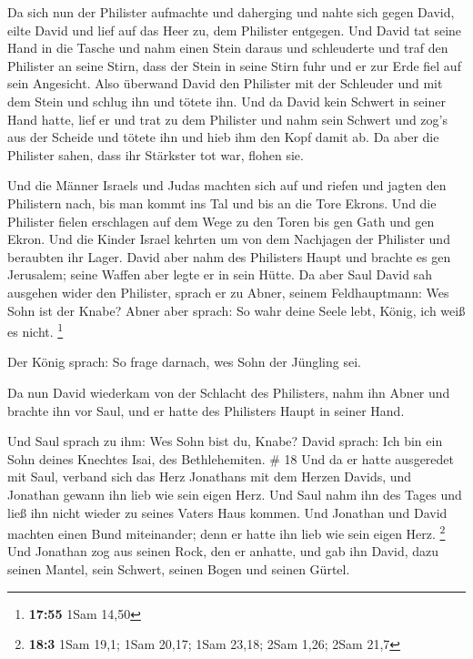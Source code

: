  Da sich nun der Philister aufmachte und daherging und
nahte sich gegen David, eilte David und lief auf das Heer zu, dem
Philister entgegen.  Und David tat seine Hand in die Tasche
und nahm einen Stein daraus und schleuderte und traf den Philister an
seine Stirn, dass der Stein in seine Stirn fuhr und er zur Erde fiel auf
sein Angesicht.  Also überwand David den Philister mit der
Schleuder und mit dem Stein und schlug ihn und tötete ihn. Und da David
kein Schwert in seiner Hand hatte,  lief er und trat zu dem
Philister und nahm sein Schwert und zog's aus der Scheide und tötete ihn
und hieb ihm den Kopf damit ab. Da aber die Philister sahen, dass ihr
Stärkster tot war, flohen sie.

 Und die Männer Israels und Judas machten sich auf und
riefen und jagten den Philistern nach, bis man kommt ins Tal und bis an
die Tore Ekrons. Und die Philister fielen erschlagen auf dem Wege zu den
Toren bis gen Gath und gen Ekron.  Und die Kinder Israel
kehrten um von dem Nachjagen der Philister und beraubten ihr Lager.
 David aber nahm des Philisters Haupt und brachte es gen
Jerusalem; seine Waffen aber legte er in sein Hütte.  Da
aber Saul David sah ausgehen wider den Philister, sprach er zu Abner,
seinem Feldhauptmann: Wes Sohn ist der Knabe? Abner aber sprach: So wahr
deine Seele lebt, König, ich weiß es nicht. \footnote{\textbf{17:55}
  1Sam 14,50}

 Der König sprach: So frage darnach, wes Sohn der Jüngling
sei.

 Da nun David wiederkam von der Schlacht des Philisters,
nahm ihn Abner und brachte ihn vor Saul, und er hatte des Philisters
Haupt in seiner Hand.

 Und Saul sprach zu ihm: Wes Sohn bist du, Knabe? David
sprach: Ich bin ein Sohn deines Knechtes Isai, des Bethlehemiten. \# 18
 Und da er hatte ausgeredet mit Saul, verband sich das Herz
Jonathans mit dem Herzen Davids, und Jonathan gewann ihn lieb wie sein
eigen Herz.  Und Saul nahm ihn des Tages und ließ ihn nicht
wieder zu seines Vaters Haus kommen.  Und Jonathan und David
machten einen Bund miteinander; denn er hatte ihn lieb wie sein eigen
Herz. \footnote{\textbf{18:3} 1Sam 19,1; 1Sam 20,17; 1Sam 23,18; 2Sam
  1,26; 2Sam 21,7}  Und Jonathan zog aus seinen Rock, den er
anhatte, und gab ihn David, dazu seinen Mantel, sein Schwert, seinen
Bogen und seinen Gürtel.

